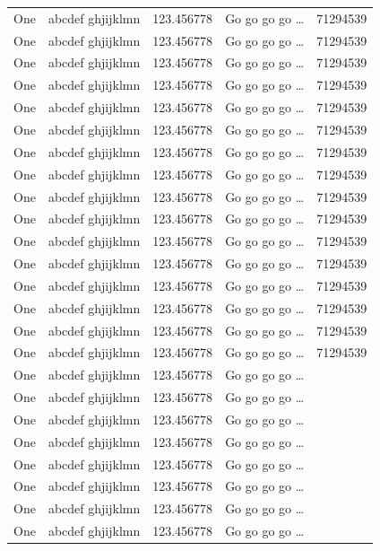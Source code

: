\documentclass[phd,showgrids]{ndsu-thesis-2022}
\begin{document}
\begin{longtable}{l l l l r}
One & abcdef ghjijklmn & 123.456778  & Go go go go \ldots & \num{71294539}\\
One & abcdef ghjijklmn & 123.456778  & Go go go go \ldots & \num{71294539}\\
One & abcdef ghjijklmn & 123.456778  & Go go go go \ldots & \num{71294539}\\
One & abcdef ghjijklmn & 123.456778  & Go go go go \ldots & \num{71294539}\\
One & abcdef ghjijklmn & 123.456778  & Go go go go \ldots & \num{71294539}\\
One & abcdef ghjijklmn & 123.456778  & Go go go go \ldots & \num{71294539}\\
One & abcdef ghjijklmn & 123.456778  & Go go go go \ldots & \num{71294539}\\
One & abcdef ghjijklmn & 123.456778  & Go go go go \ldots & \num{71294539}\\
One & abcdef ghjijklmn & 123.456778  & Go go go go \ldots & \num{71294539}\\
One & abcdef ghjijklmn & 123.456778  & Go go go go \ldots & \num{71294539}\\
One & abcdef ghjijklmn & 123.456778  & Go go go go \ldots & \num{71294539}\\
One & abcdef ghjijklmn & 123.456778  & Go go go go \ldots & \num{71294539}\\
One & abcdef ghjijklmn & 123.456778  & Go go go go \ldots & \num{71294539}\\
One & abcdef ghjijklmn & 123.456778  & Go go go go \ldots & \num{71294539}\\
One & abcdef ghjijklmn & 123.456778  & Go go go go \ldots & \num{71294539}\\
One & abcdef ghjijklmn & 123.456778  & Go go go go \ldots & \num{71294539}\\
One & abcdef ghjijklmn & 123.456778  & Go go go go \ldots \\
One & abcdef ghjijklmn & 123.456778  & Go go go go \ldots \\
One & abcdef ghjijklmn & 123.456778  & Go go go go \ldots \\
One & abcdef ghjijklmn & 123.456778  & Go go go go \ldots \\
One & abcdef ghjijklmn & 123.456778  & Go go go go \ldots \\
One & abcdef ghjijklmn & 123.456778  & Go go go go \ldots \\
One & abcdef ghjijklmn & 123.456778  & Go go go go \ldots \\
One & abcdef ghjijklmn & 123.456778  & Go go go go \ldots \\

\end{longtable}
\end{document}
